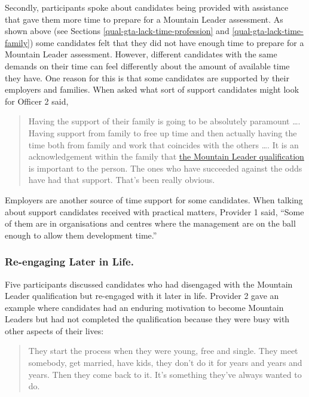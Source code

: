 \documentclass[
  12pt,
  a4paper,
]{book}
\begin{document}
Secondly, participants spoke about candidates being provided with assistance that gave them more time to prepare for a Mountain Leader assessment. As shown above (see Sections \ref{qual-gta-lack-time-profession} and \ref{qual-gta-lack-time-family}) some candidates felt that they did not have enough time to prepare for a Mountain Leader assessment. However, different candidates with the same demands on their time can feel differently about the amount of available time they have. One reason for this is that some candidates are supported by their employers and families. When asked what sort of support candidates might look for Officer 2 said,

\begin{quote}
Having the support of their family is going to be absolutely paramount \ldots. Having support from family to free up time and then actually having the time both from family and work that coincides with the others \ldots. It is an acknowledgement within the family that \protect\hyperlink{the-mountain-leader-qualification}{the Mountain Leader qualification} is important to the person. The ones who have succeeded against the odds have had that support. That's been really obvious.
\end{quote}

Employers are another source of time support for some candidates. When talking about support candidates received with practical matters, Provider 1 said, ``Some of them are in organisations and centres where the management are on the ball enough to allow them development time.''

\hypertarget{re-engaging-later-in-life.}{%
\subsubsection{Re-engaging Later in Life.}\label{re-engaging-later-in-life.}}

Five participants discussed candidates who had disengaged with the Mountain Leader qualification but re-engaged with it later in life. Provider 2 gave an example where candidates had an enduring motivation to become Mountain Leaders but had not completed the qualification because they were busy with other aspects of their lives:

\begin{quote}
They start the process when they were young, free and single. They meet somebody, get married, have kids, they don't do it for years and years and years. Then they come back to it. It's something they've always wanted to do.
\end{quote}
\end{document}
